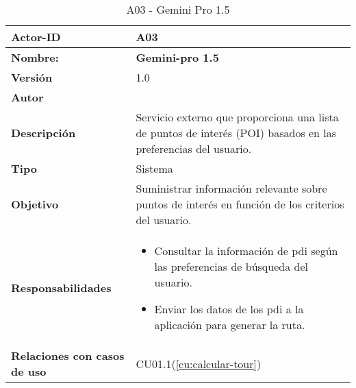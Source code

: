 \begin{table}[H]
	\centering

	\begin{tabularx}{\linewidth}{ p{} p{} }
		\toprule
		\textbf{Actor-ID}    & A03 \\
		\toprule
		\textbf{Nombre: } 			  & \textbf{Gemini-pro 1.5} \\
		\textbf{Versión}              & 1.0    \\
		\textbf{Autor}                & \autor \\
		\textbf{Descripción}          & Servicio externo que proporciona una lista de puntos de interés (POI) basados en las preferencias del usuario. \\
		\textbf{Tipo}                 & Sistema \\
		\textbf{Objetivo}             & Suministrar información relevante sobre puntos de interés en función de los criterios del usuario. \\
		\textbf{Responsabilidades}    & 
		\begin{itemize}
			\tightlist
			\item Consultar la información de \acrshort{pdi} según las preferencias de búsqueda del usuario.
			\item Enviar los datos de los \acrfull{pdi} a la aplicación para generar la ruta.
		\end{itemize}\\
		\textbf{Relaciones con casos de uso} & CU01.1(\ref{cu:calcular-tour})\\
		\bottomrule
	\end{tabularx}
	\caption{A03 - Gemini Pro 1.5}
	\label{actor:gemini}
\end{table}

